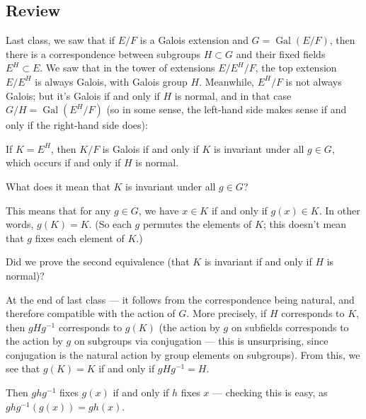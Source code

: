 \subsection{Review}

Last class, we saw that if $E/F$ is a Galois extension and $G = \operatorname{Gal}(E/F)$, then there is a correspondence between subgroups $H \subset G$ and their fixed fields $E^H \subset E$. We saw that in the tower of extensions $E/E^H/F$, the top extension $E/E^H$ is always Galois, with Galois group $H$. Meanwhile, $E^H/F$ is not always Galois; but it's Galois if and only if $H$ is normal, and in that case $G/H = \operatorname{Gal}(E^H/F)$ (so in some sense, the left-hand side  makes sense if and only if the right-hand side does):

\begin{proposition}
If $K = E^H$, then $K/F$ is Galois if and only if $K$ is invariant under all $g \in G$, which occurs if and only if $H$ is normal. 
\end{proposition}

\begin{question}
    What does it mean that $K$ is invariant under all $g \in G$?
\end{question}

\begin{ans}
This means that for any $g \in G$, we have $x \in K$ if and only if $g(x) \in K$. In other words, $g(K) = K$. (So each $g$ permutes the elements of $K$; this doesn't mean that $g$ fixes each element of $K$.)
\end{ans}

\begin{question}
    Did we prove the second equivalence (that $K$ is invariant if and only if $H$ is normal)?
\end{question}

\begin{ans}
At the end of last class --- it follows from the correspondence being natural, and therefore compatible with the action of $G$. More precisely, if $H$ corresponds to $K$, then $gHg^{-1}$ corresponds to $g(K)$ (the action by $g$ on subfields corresponds to the action by $g$ on subgroups via conjugation --- this is unsurprising, since conjugation is the natural action by group elements on subgroups). From this, we see that $g(K) = K$ if and only if $gHg^{-1} = H$. 

Then $ghg^{-1}$ fixes $g(x)$ if and only if $h$ fixes $x$ --- checking this is easy, as $ghg^{-1}(g(x)) = gh(x)$. 
\end{ans}

